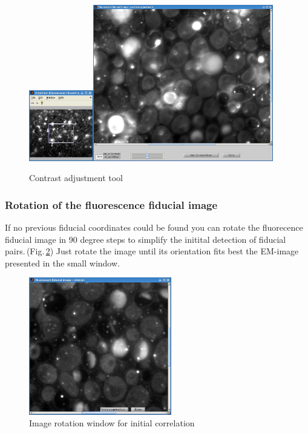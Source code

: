 \documentclass[10pt,a4paper,onepage,DIV12]{scrartcl}
\begin{document}
\begin{figure}[h!]
 \centering
 \includegraphics[width=0.25\textwidth]{images/contr_overview.jpg}\includegraphics[width=0.7\textwidth]{images/contr.jpg}
 \caption{Contrast adjustment tool}
 \label{fig:contrast}
\end{figure}

\subsubsection{Rotation of the fluorescence fiducial image}
\label{sec:rotation}

If no previous fiducial coordinates could be found you can rotate the fluorecence fiducial image in 90 degree steps to simplify the initital detection of fiducial pairs.\,(Fig.\,\ref{fig:rotate}) Just rotate the image until its orientation fits best the EM-image presented in the small window.

\begin{figure}[h]
 \centering
 \includegraphics[width=0.555\textwidth]{images/rotate.jpg}
 \caption{Image rotation window for initial correlation}
 \label{fig:rotate}
\end{figure}
\end{document}
